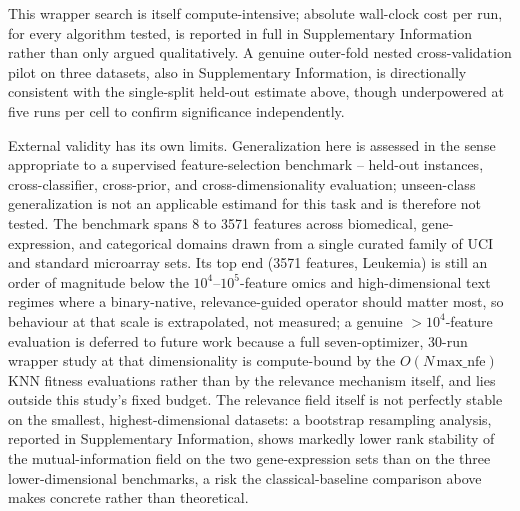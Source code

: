 \documentclass[preprint,3p,times]{elsarticle}
\begin{document}
This wrapper search is itself compute-intensive; absolute wall-clock cost
per run, for every algorithm tested, is reported in full in Supplementary
Information rather than only argued qualitatively. A genuine outer-fold
nested cross-validation pilot on three datasets, also in Supplementary
Information, is directionally consistent with the single-split held-out
estimate above, though underpowered at five runs per cell to confirm
significance independently.

External validity has its own limits. Generalization here is assessed in the
sense appropriate to a supervised feature-selection benchmark -- held-out
instances, cross-classifier, cross-prior, and cross-dimensionality evaluation;
unseen-class generalization is not an applicable estimand for this task and is
therefore not tested. The benchmark spans
8 to 3571 features across biomedical, gene-expression, and
categorical domains drawn from a single curated family of UCI and standard
microarray sets. Its top end (3571 features, Leukemia) is still an order
of magnitude below the $10^4$--$10^5$-feature omics and high-dimensional text
regimes where a binary-native, relevance-guided operator should matter most,
so behaviour at that scale is extrapolated, not measured; a genuine
$>$$10^4$-feature evaluation is deferred to future work because a full
seven-optimizer, 30-run wrapper study at that dimensionality is compute-bound
by the $O(N\,\mathrm{max\_nfe})$ KNN fitness evaluations rather than by the
relevance mechanism itself, and lies outside this study's fixed budget. The
relevance field
itself is not perfectly stable on the smallest, highest-dimensional
datasets: a bootstrap resampling analysis, reported in Supplementary
Information, shows markedly lower rank stability of the mutual-information
field on the two gene-expression sets than on the three lower-dimensional
benchmarks, a risk the classical-baseline comparison above makes concrete
rather than theoretical.
\end{document}
